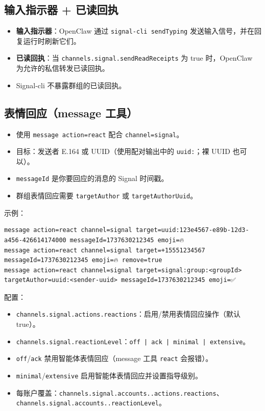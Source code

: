 \subsection{输入指示器 + 已读回执}


\begin{itemize}
  \item \textbf{输入指示器}：OpenClaw 通过 \texttt{signal-cli sendTyping} 发送输入信号，并在回复运行时刷新它们。
  \item \textbf{已读回执}：当 \texttt{channels.signal.sendReadReceipts} 为 true 时，OpenClaw 为允许的私信转发已读回执。
  \item Signal-cli 不暴露群组的已读回执。
\end{itemize}


\subsection{表情回应（message 工具）}


\begin{itemize}
  \item 使用 \texttt{message action=react} 配合 \texttt{channel=signal}。
  \item 目标：发送者 E.164 或 UUID（使用配对输出中的 \texttt{uuid:}；裸 UUID 也可以）。
  \item \texttt{messageId} 是你要回应的消息的 Signal 时间戳。
  \item 群组表情回应需要 \texttt{targetAuthor} 或 \texttt{targetAuthorUuid}。
\end{itemize}


示例：

\begin{lstlisting}
message action=react channel=signal target=uuid:123e4567-e89b-12d3-a456-426614174000 messageId=1737630212345 emoji=🔥
message action=react channel=signal target=+15551234567 messageId=1737630212345 emoji=🔥 remove=true
message action=react channel=signal target=signal:group:<groupId> targetAuthor=uuid:<sender-uuid> messageId=1737630212345 emoji=✅
\end{lstlisting}


配置：

\begin{itemize}
  \item \texttt{channels.signal.actions.reactions}：启用/禁用表情回应操作（默认 true）。
  \item \texttt{channels.signal.reactionLevel}：\texttt{off | ack | minimal | extensive}。
  \item \texttt{off}/\texttt{ack} 禁用智能体表情回应（message 工具 \texttt{react} 会报错）。
  \item \texttt{minimal}/\texttt{extensive} 启用智能体表情回应并设置指导级别。
  \item 每账户覆盖：\texttt{channels.signal.accounts..actions.reactions}、\texttt{channels.signal.accounts..reactionLevel}。
\end{itemize}


